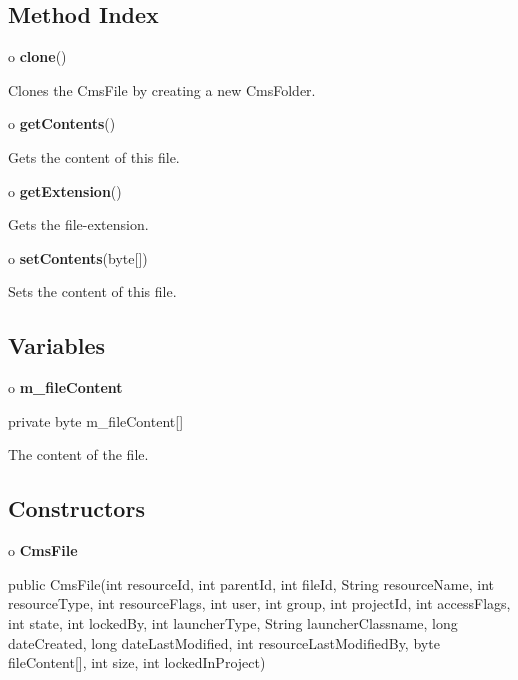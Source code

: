 \subsection*{  Method Index }

\begin{description}
\item o {\bf clone}()  

Clones the CmsFile by creating a new CmsFolder.  
\item o {\bf getContents}()  

Gets the content of this file.  
\item o {\bf getExtension}()  

Gets the file-extension.  
\item o {\bf setContents}(byte[])  

Sets the content of this file. 
\end{description}

\subsection*{  Variables }

o {\bf m\_fileContent} 

\begin{PRE}
 private byte m\_fileContent[]
\end{PRE}

\begin{description}
\htmlDD The content of the file.

\end{description}

\subsection*{  Constructors }

o {\bf CmsFile} 

\begin{PRE}
 public CmsFile(int resourceId,
                int parentId,
                int fileId,
                String resourceName,
                int resourceType,
                int resourceFlags,
                int user,
                int group,
                int projectId,
                int accessFlags,
                int state,
                int lockedBy,
                int launcherType,
                String launcherClassname,
                long dateCreated,
                long dateLastModified,
                int resourceLastModifiedBy,
                byte fileContent[],
                int size,
                int lockedInProject)
\end{PRE}

